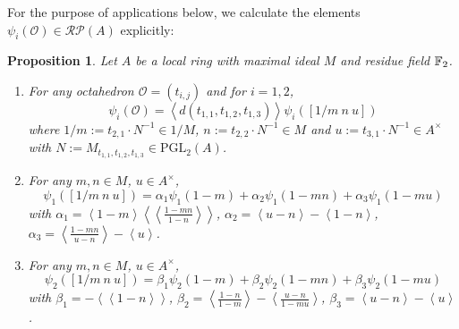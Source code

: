 \documentclass[12pt]{amsart}
\newtheorem{prop}[lem]{Proposition}
\theoremstyle{definition}
\newcommand{\F}[1]{\Bbb{F}_{#1}}
\newcommand{\oct}{\mathcal{O}}%
\newcommand{\scyc}[1]{\left[ #1 \right]} %
\newcommand{\pgl}[2]{\mathrm{PGL}_{#1}(#2)}
\newcommand{\rpb}[1]{\mathcal{RP}(#1)}%
\newcommand{\suss}[2]{\psi_{#1}\left( #2\right)}
\newcommand{\<}{\langle}
\renewcommand{\>}{\rangle}
\newcommand{\an}[1]{\left\langle{#1}\right\rangle}
\newcommand{\pf}[1]{\left\langle\!\left\langle{#1}\right\rangle\!\right\rangle}
\begin{document}
For the purpose of applications below, we calculate the elements $\suss{i}{\oct}\in \rpb{A}$ explicitly:

\begin{prop}\label{prop:susscalc} Let $A$ be a local ring with maximal ideal $M$ and residue field $\F{2}$.
\begin{enumerate}
\item For any octahedron $\oct=(t_{i,j})$ and for $i=1,2$, 
\[
\suss{i}{\oct}=\an{d(t_{1,1},t_{1,2},t_{1,3})}\suss{i}{\scyc{ 1/m\ n\ u}}
\]
 where
$1/m:=t_{2,1}\cdot N^{-1}\in 1/M$, $n:=t_{2,2}\cdot N^{-1}\in M$ and $u:=t_{3,1}\cdot N^{-1}\in A^\times$ with $N:=M_{t_{1,1},t_{1,2},t_{1,3}}\in \pgl{2}{A}$.
\item For any $m,n\in M$, $u\in A^\times$, 
\[
\suss{1}{\scyc{ 1/m\ n\ u}} = \alpha_1\suss{1}{1-m}+\alpha_2\suss{1}{1-mn}+\alpha_3\suss{1}{1-mu}
\]
 with
$\alpha_1=\an{1-m}\pf{\frac{1-mn}{1-n}}$, $\alpha_2=\an{u-n}-\an{1-n}$, $\alpha_3=\an{\frac{1-mn}{u-n}}-\an{u}$.
\item For any $m,n\in M$, $u\in A^\times$, 
\[
\suss{2}{\scyc{ 1/m\ n\ u}} = \beta_1\suss{2}{1-m}+\beta_2\suss{2}{1-mn}+\beta_3\suss{2}{1-mu}
\]
 with
$\beta_1=-\pf{1-n}$, $\beta_2=\an{\frac{1-n}{1-m}}-\an{\frac{u-n}{1-mu}}$, $\beta_3=\an{{u-n}}-\an{u}$.
\end{enumerate}
\end{prop}
\end{document}

